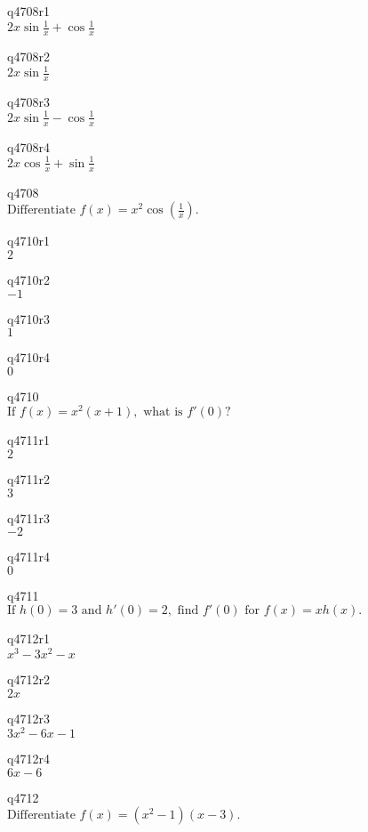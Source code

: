 q4708r1\\
\(\displaystyle 2x \sin \frac{1}{x} + \cos \frac{1}{x} \)

q4708r2\\
\(\displaystyle 2x\sin \frac{1}{x} \)

q4708r3\\
\(\displaystyle 2x \sin \frac{1}{x} - \cos \frac{1}{x} \)

q4708r4\\
\(\displaystyle 2x \cos \frac{1}{x} + \sin \frac{1}{x} \)

q4708\\
\(\displaystyle \text{Differentiate } f(x) = x^2 \cos \left ( \frac{1}{x} \right ). \)

q4710r1\\
\(\displaystyle 2 \)

q4710r2\\
\(\displaystyle -1 \)

q4710r3\\
\(\displaystyle 1 \)

q4710r4\\
\(\displaystyle 0 \)

q4710\\
\(\displaystyle \text{If } f(x) = x^2(x+1), \text{ what is } f'(0)? \)

q4711r1\\
\(\displaystyle 2 \)

q4711r2\\
\(\displaystyle 3 \)

q4711r3\\
\(\displaystyle -2 \)

q4711r4\\
\(\displaystyle 0 \)

q4711\\
\(\displaystyle \text{If } h(0) = 3 \text{ and } h'(0) = 2, \text{ find } f'(0) \text{ for } f(x) = xh(x). \)

q4712r1\\
\(\displaystyle x^3 - 3x^2 - x \)

q4712r2\\
\(\displaystyle 2x \)

q4712r3\\
\(\displaystyle 3x^2 - 6x - 1 \)

q4712r4\\
\(\displaystyle 6x - 6 \)

q4712\\
\(\displaystyle \text{Differentiate } f(x) = (x^2-1)(x-3). \)

